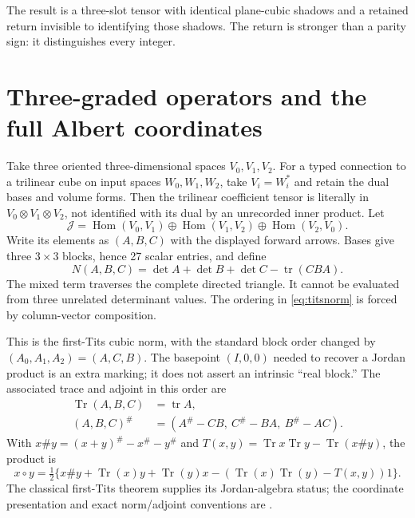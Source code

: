 \documentclass[11pt,reqno]{amsart}
\theoremstyle{definition}\newtheorem{definition}[theorem]{Definition}
\theoremstyle{remark}\newtheorem{remark}[theorem]{Remark}
\DeclareMathOperator{\tr}{tr}\DeclareMathOperator{\Tr}{Tr}\DeclareMathOperator{\Ann}{Ann}\DeclareMathOperator{\Fix}{Fix}\DeclareMathOperator{\diag}{diag}\DeclareMathOperator{\lcm}{lcm}\DeclareMathOperator{\Ree}{Re}\DeclareMathOperator{\Jac}{Jac}\DeclareMathOperator{\Pic}{Pic}
\begin{document}
The result is a three-slot tensor with identical plane-cubic
shadows and a retained return invisible to identifying those shadows.
The return is stronger than a parity sign: it distinguishes every integer.

\section{Three-graded operators and the full Albert coordinates}

Take three oriented three-dimensional spaces $V_0,V_1,V_2$. For a typed
connection to a trilinear cube on input spaces $W_0,W_1,W_2$, take
$V_i=W_i^*$ and retain the dual bases and volume forms. Then the trilinear
coefficient tensor is literally in $V_0\otimes V_1\otimes V_2$, not identified
with its dual by an unrecorded inner product. Let
\[
 \mathcal J=\operatorname{Hom}(V_0,V_1)\oplus
 \operatorname{Hom}(V_1,V_2)\oplus\operatorname{Hom}(V_2,V_0).
\]
Write its elements as $(A,B,C)$ with the displayed forward arrows. Bases give
three $3\times3$ blocks, hence 27 scalar entries, and define
\begin{equation}\label{eq:titsnorm}
 N(A,B,C)=\det A+\det B+\det C-\tr(CBA).
\end{equation}
The mixed term traverses the complete directed triangle. It cannot be evaluated
from three unrelated determinant values. The ordering in \eqref{eq:titsnorm}
is forced by column-vector composition.

This is the first-Tits cubic norm, with the standard block order changed by
$(A_0,A_1,A_2)=(A,C,B)$. The basepoint $(I,0,0)$ needed to recover a Jordan
product is an extra marking; it does not assert an intrinsic ``real block.''
The associated trace and adjoint in this order are
\begin{align*}
 \Tr(A,B,C)&=\tr A,\\
 (A,B,C)^\#&=(A^\#-CB,\ C^\#-BA,\ B^\#-AC).
\end{align*}
With $x\#y=(x+y)^\#-x^\#-y^\#$ and
$T(x,y)=\Tr x\Tr y-\Tr(x\#y)$, the product is
\[
 x\circ y=\tfrac12\{x\#y+\Tr(x)y+\Tr(y)x
 -(\Tr(x)\Tr(y)-T(x,y))1\}.
\]
The classical first-Tits theorem supplies its Jordan-algebra status; the
coordinate presentation and exact norm/adjoint conventions are
\cite[\S5, equations (10)--(15)]{BP}.
\end{document}
